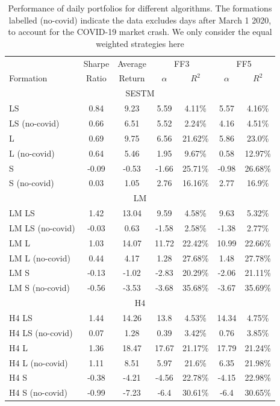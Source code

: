 \begin{table}[!t]
\begin{center}
\begin{tabular}{lcccccc}
      \toprule
      & Sharpe &  Average &  \multicolumn{2}{c}{FF3} & \multicolumn{2}{c}{FF5} \\
      \cmidrule(lr){4-5}
      \cmidrule(lr){6-7}
      Formation & Ratio & Return &  $\alpha$ & $R^2$ & $\alpha$ & $R^2$ \\
      \midrule
      \multicolumn{7}{c}{SESTM} \\
LS & 0.84 & 9.23 & 5.59 & 4.11\% & 5.57 & 4.16\% \\
LS (no-covid) & 0.66 & 6.51 & 5.52 & 2.24\% & 4.16 & 4.51\% \\
L & 0.69 & 9.75 & 6.56 & 21.62\% & 5.86 & 23.0\% \\
L (no-covid) & 0.64 & 5.46 & 1.95 & 9.67\% & 0.58 & 12.97\% \\
S & -0.09 & -0.53 & -1.66 & 25.71\% & -0.98 & 26.68\% \\
S (no-covid) & 0.03 & 1.05 & 2.76 & 16.16\% & 2.77 & 16.9\% \\
   \multicolumn{7}{c}{LM} \\
LM LS & 1.42 & 13.04 & 9.59 & 4.58\% & 9.63 & 5.32\% \\
LM LS (no-covid) & -0.03 & 0.63 & -1.58 & 2.58\% & -1.38 & 2.77\% \\
LM L & 1.03 & 14.07 & 11.72 & 22.42\% & 10.99 & 22.66\% \\
LM L (no-covid) & 0.44 & 4.17  & 1.28 & 27.68\% & 1.48 & 27.78\% \\
LM S & -0.13 & -1.02 & -2.83 & 20.29\% & -2.06 & 21.11\% \\
LM S (no-covid) & -0.56 & -3.53 & -3.68 & 35.68\% & -3.67 & 35.69\% \\
   \multicolumn{7}{c}{H4} \\
H4 LS & 1.44 & 14.26 & 13.8 & 4.53\% & 14.34 & 4.75\% \\
H4 LS (no-covid) & 0.07 & 1.28 & 0.39 & 3.42\% & 0.76 & 3.85\% \\
H4 L & 1.36 & 18.47 & 17.67 & 21.17\% & 17.79 & 21.24\% \\
H4 L (no-covid) & 1.11 & 8.51 & 5.97 & 21.6\% & 6.35 & 21.98\% \\
H4 S & -0.38 & -4.21 & -4.56 & 22.78\% & -4.15 & 22.98\% \\
H4 S (no-covid) & -0.99 & -7.23 & -6.4 & 30.61\% & -6.4 & 30.65\% \\
      \bottomrule

\end{tabular}
\caption[Daily portfolio comparison]{Performance of daily portfolios for different algorithms. The formations labelled (no-covid) indicate the data excludes days after March 1 2020, to account for the COVID-19 market crash. We only consider the equal weighted strategies here}
\label{portfolio-performance-comparison}
\end{center}
\end{table}

